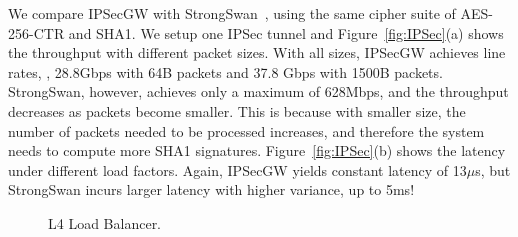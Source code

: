  We compare IPSecGW with StrongSwan~\cite{strongswan}, using the same cipher suite of
AES-256-CTR and SHA1. We setup one IPSec tunnel and Figure~\ref{fig:IPSec}(a) shows the throughput with different packet sizes.
With all sizes, IPSecGW achieves line rates, \ie, 28.8Gbps with 64B packets and 37.8 Gbps with 1500B packets. 
%
StrongSwan, however, achieves only a maximum of 628Mbps, and the throughput decreases as packets become smaller.
This is because with smaller size, the number of packets needed to be processed increases, 
and therefore the system needs to compute more SHA1 signatures.
%
Figure~\ref{fig:IPSec}(b) shows the latency under different load factors. Again, IPSecGW yields constant latency of 13$\mu$s, 
but StrongSwan incurs larger latency with higher variance, up to 5ms!

\begin{figure}[t!]
	\centering
	
\vspace{-10pt}
	\caption{L4 Load Balancer.}
	\label{fig:l4}
\vspace{-10pt}
\end{figure}


